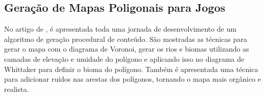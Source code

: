 \subsection*{Geração de Mapas Poligonais para Jogos}

No artigo de , é apresentada toda uma jornada de desenvolvimento de um algoritmo de geração procedural de conteúdo. São mostradas as técnicas para gerar o mapa com o diagrama de Voronoi, gerar os rios e biomas utilizando as camadas de elevação e umidade do polígono e aplicando isso no diagrama de Whittaker para definir o bioma do polígono. Também é apresentada uma técnica para adicionar ruídos nas arestas dos polígonos, tornando o mapa mais orgânico e realista.
